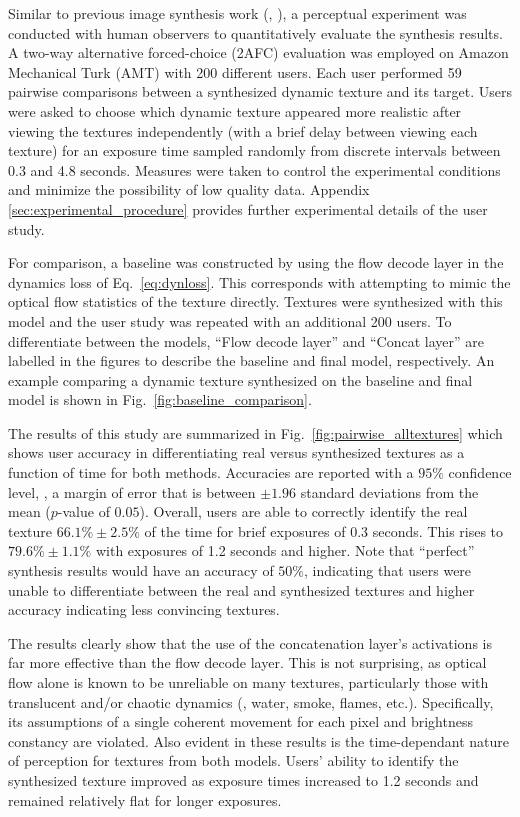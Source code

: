 Similar to previous image synthesis work (\eg, \cite{chen2017}), 
a perceptual experiment was conducted with human observers to 
quantitatively evaluate the synthesis results.
A two-way alternative forced-choice (2AFC) evaluation was employed on Amazon Mechanical
Turk (AMT) with 200 different users. Each user performed 59
pairwise comparisons between a synthesized dynamic texture and 
its target.
Users were asked to choose which dynamic texture appeared more realistic
after viewing the textures independently (with a brief delay between viewing each texture) for an exposure time sampled
randomly from discrete intervals between 0.3 and 4.8 seconds.
Measures were taken to control the experimental conditions and
minimize the possibility of low quality data.
Appendix \ref{sec:experimental_procedure} provides further experimental
details of the user study.

For comparison, a baseline was constructed by using the 
flow decode layer in the dynamics loss of Eq.\ \ref{eq:dynloss}.
This  corresponds with attempting to mimic the optical flow 
statistics of the texture directly.
Textures were synthesized with this model and the user study
was repeated with an additional 200 users.
To differentiate between the models, ``Flow decode layer'' 
and ``Concat layer'' are labelled in the figures to describe the
baseline and final model, respectively. An example comparing a dynamic texture synthesized on the baseline and final model is shown in Fig.\ \ref{fig:baseline_comparison}.



The results of this study are summarized in
Fig.\ \ref{fig:pairwise_alltextures} which shows user accuracy in
differentiating real versus synthesized textures as a function of
time for both methods. Accuracies are reported with a $95\%$ confidence level, \ie, a margin of error that is between $\pm 1.96$ standard deviations from the mean ($p$-value of $0.05$).
Overall, users are able to correctly identify the real texture
$66.1\% \pm 2.5\%$ of the time for brief 
exposures of 0.3 seconds.
This rises to $79.6\% \pm 1.1\%$ with exposures of 1.2 seconds 
and higher.
Note that ``perfect'' synthesis results would have an accuracy
of $50\%$, indicating that users were unable to differentiate 
between the real and synthesized textures and higher accuracy 
indicating less convincing textures.



The results clearly show that the use of the concatenation 
layer's activations is far more effective than the flow decode 
layer.
This is not surprising, as optical flow alone is known to be 
unreliable on many textures, particularly those with
translucent and/or chaotic dynamics (\eg, water, smoke, flames, etc.). Specifically, its assumptions of a single coherent movement for each pixel and brightness constancy are violated.
Also evident in these results is the time-dependant nature of 
perception for textures from both models.
Users' ability to identify the synthesized texture improved as 
exposure times increased to 1.2 seconds and remained relatively 
flat for longer exposures.


